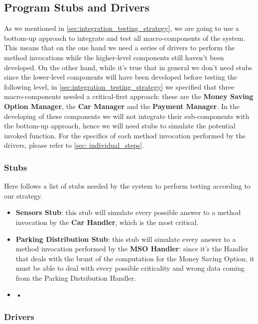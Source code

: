 	\subsection{Program Stubs and Drivers}
	
	As we mentioned in \autoref{sec:integration_testing_strategy}, we are going to use a bottom-up approach to integrate and test all macro-components of the system. This means that on the one hand we need a series of drivers to perform the method invocations while the higher-level components still haven't been developed. On the other hand, while it's true that in general we don't need stubs since the lower-level components will have been developed before testing the following level, in \autoref{sec:integration_testing_strategy} we specified that three macro-components needed a critical-first approach: these are the \textbf{Money Saving Option Manager}, the \textbf{Car Manager} and the \textbf{Payment Manager}. In the developing of these components we will not integrate their sub-components with the bottom-up approach, hence we will need stubs to simulate the potential invoked function.
	For the specifics of each method invocation performed by the drivers, please refer to \autoref{sec: individual_steps}.
		
		\subsubsection{Stubs}
		
		Here follows a list of stubs needed by the system to perform testing according to our strategy.
		
			\begin{itemize}
				\item \textbf{Sensors Stub}: this stub will simulate every possible answer to a method invocation by the \textbf{Car Handler}, which is the most critical. %
				\item \textbf{Parking Distribution Stub}: this stub will simulate every answer to a method invocation performed by the \textbf{MSO Handler}: since it's the Handler that deals with the brunt of the computation for the Money Saving Option, it must be able to deal with every possible criticality and wrong data coming from the Parking Distribution Handler.
				\item \textbf{•} %
			\end{itemize}
		
		
		\subsubsection{Drivers}
		
